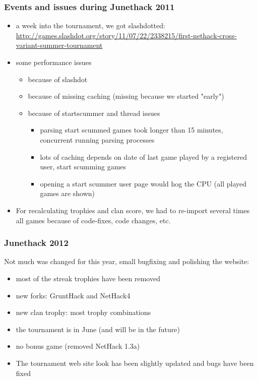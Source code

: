 \documentclass{beamer}
\begin{document}
\begin{frame}
\frametitle{Events and issues during Junethack 2011}
  \pause
  \begin{itemize}[<+->]
    \item a week into the tournament, we got slashdotted: \url{http://games.slashdot.org/story/11/07/22/2338215/first-nethack-cross-variant-summer-tournament}
    \item some performance issues
    \begin{itemize}[<+->]
      \item because of slashdot
      \item because of missing caching (missing because we started "early")
      \item because of startscummer and thread issues
      \begin{itemize}[<+->]
        \item parsing start scummed games took longer than 15 minutes, concurrent running parsing processes
        \item lots of caching depends on date of last game played by a registered user, start scumming games
        \item opening a start scummer user page would hog the CPU (all played games are shown)
      \end{itemize}
    \end{itemize}
    \item For recalculating trophies and clan score, we had to re-import several times all games because of code-fixes, code changes, etc.
  \end{itemize}
\end{frame}



\begin{frame}
\frametitle{Junethack 2012}
  Not much was changed for this year, small bugfixing and polishing the website:\pause
  \begin{itemize}[<+->]
    \item most of the streak trophies have been removed
    \item new forks: GruntHack and NetHack4
    \item new clan trophy: most trophy combinations
    \item the tournament is in June (and will be in the future)
    \item no bonus game (removed NetHack 1.3a)
    \item The tournament web site look has been slightly updated and bugs have been fixed
  \end{itemize}
\end{frame}
\end{document}
